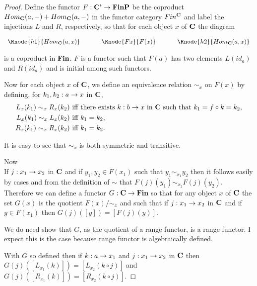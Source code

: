 \begin{proof}
Define the functor $F: \textbf{C'} \rightarrow \textbf{FinP}$ be the coproduct $Hom_{\textbf{C}}(a,-) + Hom_{\textbf{C}}(a,-)$
in the functor category $Fin^{\textbf{C}}$ and label the injections $L$ and $R$, respectively,
so that for each object $x$ of $\textbf{C}$ the diagram
\begin{center}
$
\begin{array}{c p{0.5cm} c p{0.5cm} c  }
\Rnode{h1}{Hom_{\catc}(a,x)}  &&\Rnode{Fx}{F(x)}  &&   \Rnode{h2}{Hom_{\catc}(a,x)}       
\end{array} 
$
\end{center}
is a coproduct in $\textbf{Fin}$. $F$ is a functor such that $F(a)$ has two elements
$L(id_a)$ and $R(id_a)$ and is initial among such functors.

Now for each object $x$ of $\textbf{C}$, we define an equivalence relation $\sim_x$ on $F(x)$ by defining,
for $k_1,k_2:a \rightarrow x$ in $\textbf{C}$,
\begin{align*}
L_x(k_1) \sim_x R_x(k_2) & \mbox{ iff there exists $k:b \rightarrow x$ in $\textbf{C}$ such that $k_1 = f \circ k = k_2$,}\\
L_x(k_1) \sim_x L_x(k_2) & \mbox{ iff $k_1 = k_2$,} \\
R_x(k_1) \sim_x R_x(k_2) & \mbox{ iff $k_1 = k_2$.} \\
\end{align*}
\begin{newtt}
It is easy to see that $\sim_x$  is both symmetric and transitive. \\
\end{newtt}
Now \\
If $j: x_1 \rightarrow x_2$ in $\textbf{C}$ and if $y_1,y_2 \in F(x_1)$ such that $y_1 \sim_{x_1} y_2$
then it follows easily by cases and from the definition of $\sim$ that $F(j)(y_1) \sim_{x_2} F(j)(y_2)$.
Therefore we can define a functor 
 $G: \textbf{C} \rightarrow \textbf{Fin}$  so that for any object $x$ of $\textbf{C}$
the set $G(x)$ is the quotient $F(x)/{\sim_x}$ and such that 
if $j: x_1 \rightarrow x_2$ in $\textbf{C}$ and if $y \in F(x_1)$ then $G(j)([y])=[F(j)(y)]$.

\begin{newtt}
We do need show that $G$, as the quotient of a range functor, is a range functor. I expect this is the case because range functor is algebraically defined.
\end{newtt}

With $G$ so defined then if $k: a \rightarrow x_1$ and $j:x_1 \rightarrow x_2$ in $\textbf{C}$
then  $G(j)([L_{x_1}(k)])=[L_{x_2}(k \circ j)]$ and $G(j)([R_{x_1}(k)])=[R_{x_2}(k \circ j)]$. 


\end{proof}
